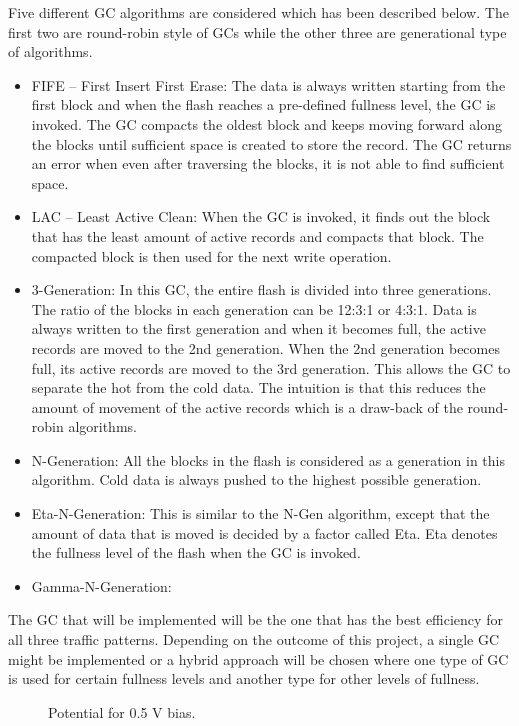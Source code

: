 Five different GC algorithms are considered which has been described below. The first two are round-robin style of GCs while the other three are generational type of algorithms.
\begin{itemize}
\item FIFE – First Insert First Erase:
The data is always written starting from the first block and when the flash reaches a pre-defined fullness level, the GC is invoked. The GC compacts the oldest block and keeps moving forward along the blocks until sufficient space is created to store the record. The GC returns an error when even after traversing the blocks, it is not able to find sufficient space. 
\item LAC – Least Active Clean:
When the GC is invoked, it finds out the block that has the least amount of active records and compacts that block. The compacted block is then used for the next write operation.
\item 3-Generation:
In this GC, the entire flash is divided into three generations. The ratio of the blocks in each generation can be 12:3:1 or 4:3:1. Data is always written to the first generation and when it becomes full, the active records are moved to the 2nd generation. When the 2nd generation becomes full, its active records are moved to the 3rd generation. This allows the GC to separate the hot from the cold data. The intuition is that this reduces the amount of movement of the active records which is a draw-back of the round-robin algorithms.
\item N-Generation:
All the blocks in the flash is considered as a generation in this algorithm. Cold data is always pushed to the highest possible generation.
\item Eta-N-Generation:
This is similar to the N-Gen algorithm, except that the amount of data that is moved is decided by a factor called Eta. Eta denotes the fullness level of the flash when the GC is invoked.
\item Gamma-N-Generation:
\end{itemize}	


The GC that will be implemented will be the one that has the best efficiency for all three traffic patterns. Depending on the outcome of this project, a single GC might be implemented or a hybrid approach will be chosen where one type of GC is used for certain fullness levels and another type for other levels of fullness.

\begin{figure}
\centering
{} 
\caption{Potential for 0.5 V bias.} 
\label{fig:EcUND} 
\end{figure} 


